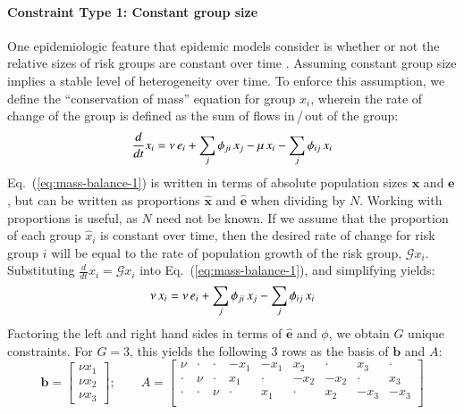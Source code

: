 \paragraph{Constraint Type 1: Constant group size}
\label{con:const-group}
One epidemiologic feature that epidemic models consider
is whether or not the relative sizes of risk groups are constant over time
\citep{Henry2015,Boily2015}.
Assuming constant group size implies a stable level of heterogeneity over time.
To enforce this assumption,
we define the ``conservation of mass'' equation for group $x_i$,
wherein the rate of change of the group
is defined as the sum of flows in\,/\,out of the group:
\begin{equation}\label{eq:mass-balance-1}
\frac{d}{dt}x_i
= \nu \thinspace e_i + \sum_{j}{\phi_{ji} \thinspace x_j}
- \mu \thinspace x_i - \sum_{j}{\phi_{ij} \thinspace x_i}
\end{equation}
Eq.~(\ref{eq:mass-balance-1}) is written in terms of
absolute population sizes $\bm{x}$ and $\bm{e}$,
but can be written
as proportions $\bm{\hat{x}}$ and $\bm{\hat{e}}$
when dividing by $N$.
Working with proportions is useful, as $N$ need not be known.
If we assume that the proportion of each group $\hat{x}_i$ is constant over time,
then the desired rate of change for risk group $i$
will be equal to the rate of population growth of the risk group, $\mathcal{G} x_i$.
Substituting $\frac{d}{dt}x_i = \mathcal{G} x_i$
into Eq.~(\ref{eq:mass-balance-1}),
and simplifying yields:
\begin{equation}\label{eq:mass-balance-2}
\nu \thinspace x_i
= \nu \thinspace e_i + \sum_{j}{\phi_{ji} \thinspace x_j}
- \sum_{j}{\phi_{ij} \thinspace x_i}
\end{equation}
Factoring the left and right hand sides in terms of $\bm{\hat{e}}$ and $\phi$,
we obtain $G$ unique constraints.
For $G = 3$, this yields the following 3 rows as the basis of $\bm{b}$ and $A$:
\begin{equation}\label{eq:eg-basis}
\bm{b} = \left[\begin{array}{c}
\nu x_1 \\ \nu x_2 \\ \nu x_3
\end{array}\right];\qquad
A = \left[\begin{array}{ccccccccc}
 \nu  & \cdot & \cdot & -x_1  & -x_1  &  x_2  & \cdot &  x_3  & \cdot \\
\cdot &  \nu  & \cdot &  x_1  & \cdot & -x_2  & -x_2  & \cdot &  x_3  \\
\cdot & \cdot &  \nu  & \cdot &  x_1  & \cdot &  x_2  & -x_3  & -x_3  \\
\end{array}\right] 
\end{equation}

